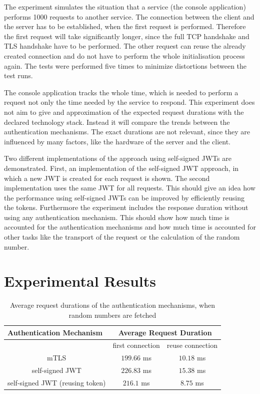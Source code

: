 The experiment simulates the situation that a service (the console application) performs 1000 requests to another service.
The connection between the client and the server has to be established, when the first request is performed.
Therefore the first request will take significantly longer, since the full TCP handshake and TLS handshake have to be performed.
The other request can reuse the already created connection and do not have to perform the whole initialisation process again.
The tests were performed five times to minimize distortions between the test runs.

The console application tracks the whole time, which is needed to perform a request not only the time needed by the service to respond.
This experiment does not aim to give and approximation of the expected request durations with the declared technology stack.
Instead it will compare the trends between the authentication mechanisms.
The exact durations are not relevant, since they are influenced by many factors, like the hardware of the server and the client.

Two different implementations of the approach using self-signed JWTs are demonstrated.
First, an implementation of the self-signed JWT approach, in which a new JWT is created for each request is shown.
The second implementation uses the same JWT for all requests.
This should give an idea how the performance using self-signed JWTs can be improved by efficiently reusing the tokens.
Furthermore the experiment includes the response duration without using any authentication mechanism.
This should show how much time is accounted for the authentication mechanisms and how much time is accounted for other tasks like the transport of the request or the calculation of the random number.

\section{Experimental Results}

\begin{table}[H]
\begin{tabular}{c|cc}
\multicolumn{1}{l|}{\textbf{Authentication Mechanism}} & \multicolumn{2}{c}{\textbf{Average Request Duration}} \\ \hline
\multicolumn{1}{c|}{} & \multicolumn{1}{c|}{first connection} & reuse connection \\ \hline
mTLS & \multicolumn{1}{c|}{$199.66$ ms} & $10.18$ ms \\ \hline
self-signed JWT & \multicolumn{1}{c|}{$226.83$ ms} & $15.38$ ms \\ \hline
self-signed JWT (reusing token) & \multicolumn{1}{c|}{$216.1$ ms} & $8.75$ ms 
\end{tabular}
\caption{Average request durations of the authentication mechanisms, when random numbers are fetched}
\label{tab:experiment_case_1}
\end{table}

